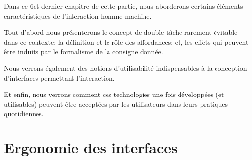 \begin{resumChap}
Dans ce 6\ieme et dernier chapitre de cette partie, nous aborderons certains éléments caractéristiques de l'interaction homme-machine. \par%
Tout d'abord nous présenterons le concept de double-tâche rarement évitable dans ce contexte; la définition et le rôle des affordances; et, les effets qui peuvent être induits par le formalisme de la consigne donnée.\par%
Nous verrons également des notions d'utilisabilité indispensables à la conception d'interfaces permettant l'interaction.\par%
Et enfin, nous verrons comment ces technologies une fois développées (et utilisables) peuvent être acceptées par les utilisateurs dans leurs pratiques quotidiennes.\end{resumChap}{}
\section{Ergonomie des interfaces}
